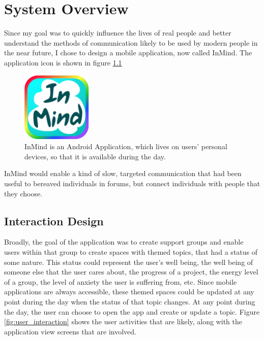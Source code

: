 \chapter{System Overview}
  Since my goal was to quickly influence the lives of real people
  and better understand the methods of communication likely to be used by
  modern people in the near future, I chose to design
  a mobile application, now called InMind.
  The application icon is shown in figure \ref{fig:application_icon}

  \begin{figure}
  \centering
  \includegraphics[width=0.3\textwidth]{inmind_logo2.png}
  \caption{InMind is an Android Application,
  which lives on users' personal devices,
  so that it is available during the day.}
  \label{fig:application_icon}
  \end{figure}

  InMind would enable a kind of slow,
  targeted communication that had been useful to bereaved individuals in forums,
  but connect individuals with people that they choose.

  \section{Interaction Design}
  Broadly, the goal of the application was to create support groups and 
  enable users within that group to create spaces
  with themed topics, that had a status of some nature.
  This status could represent the user's well being, the well being of someone else
  that the user cares about, the progress of a project, the energy level of a group,
  the level of anxiety the user is suffering from, etc.
  Since mobile applications are always accessible,
  these themed spaces could be updated at any point
  during the day when the status of that topic changes.
  At any point during the day,
  the user can choose to open the app and create or update a topic.
  Figure \ref{fig:user_interaction} shows the user activities
  that are likely, along with the application view screens that are involved.
 
